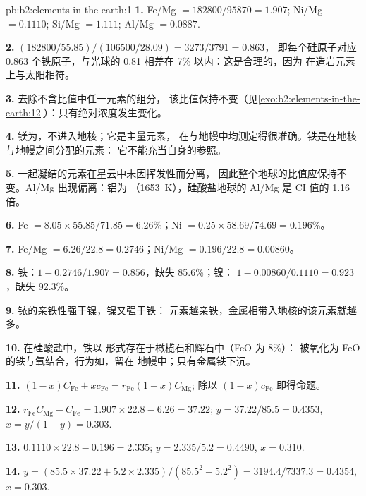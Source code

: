 \begin{solution}{pb:b2:elements-in-the-earth:1}
\textbf{1.} Fe/Mg $= \num{182800}/\num{95870} = 1.907$; Ni/Mg $= 0.1110$; Si/Mg $=
1.111$; Al/Mg $= 0.0887$.

\textbf{2.} $(\num{182800}/55.85)/(\num{106500}/28.09) = 3273/3791 = 0.863$，
即每个硅原子对应 0.863 个铁原子，与光球的 0.81 相差在 7\% 以内：这是合理的，因为 
在造岩元素上与太阳相符。

\textbf{3.} 去除不含比值中任一元素的组分，
该比值保持不变（见\cref{exo:b2:elements-in-the-earth:12}）：只有绝对浓度发生变化。

\textbf{4.} 镁为，不进入地核；它是主量元素，
在与地幔中均测定得很准确。铁是在地核与地幔之间分配的元素：
它不能充当自身的参照。

\textbf{5.} 一起凝结的元素在星云中未因挥发性而分离，
因此整个地球的比值应保持不变。Al/Mg 出现偏离：铝为
（\qty{1653}{K}），硅酸盐地球的 Al/Mg 是 CI 值的 1.16 倍。

\textbf{6.} Fe $= 8.05\times55.85/71.85 = 6.26$\%；Ni $= 0.25\times58.69/74.69 =
0.196$\%。

\textbf{7.} Fe/Mg $= 6.26/22.8 = 0.2746$；Ni/Mg $= 0.196/22.8 = 0.00860$。

\textbf{8.} 铁：$1 - 0.2746/1.907 = 0.856$，缺失 85.6\%；镍：
$1 - 0.00860/0.1110 = 0.923$，缺失 92.3\%。

\textbf{9.} 铱的亲铁性强于镍，镍又强于铁：
元素越亲铁，金属相带入地核的该元素就越多。

\textbf{10.} 在硅酸盐中，铁以  形式存在于橄榄石和辉石中（FeO 为 8\%）：
被氧化为 FeO 的铁与氧结合，行为如，留在
地幔中；只有金属铁下沉。

\textbf{11.} $(1-x)C_{\mathrm{Fe}} + xc_{\mathrm{Fe}} = r_{\mathrm{Fe}}(1-x)C_{\mathrm{Mg}}$;
除以 $(1-x)c_{\mathrm{Fe}}$ 即得命题。

\textbf{12.} $r_{\mathrm{Fe}}C_{\mathrm{Mg}} - C_{\mathrm{Fe}} = 1.907\times22.8 - 6.26 =
37.22$; $y = 37.22/85.5 = 0.4353$, $x = y/(1+y) = 0.303$.

\textbf{13.} $0.1110\times22.8 - 0.196 = 2.335$; $y = 2.335/5.2 = 0.4490$, $x = 0.310$.

\textbf{14.} $y = (85.5\times37.22 + 5.2\times2.335)/(85.5^2 + 5.2^2) =
3194.4/7337.3 = 0.4354$, $x = 0.303$.


\end{solution}
